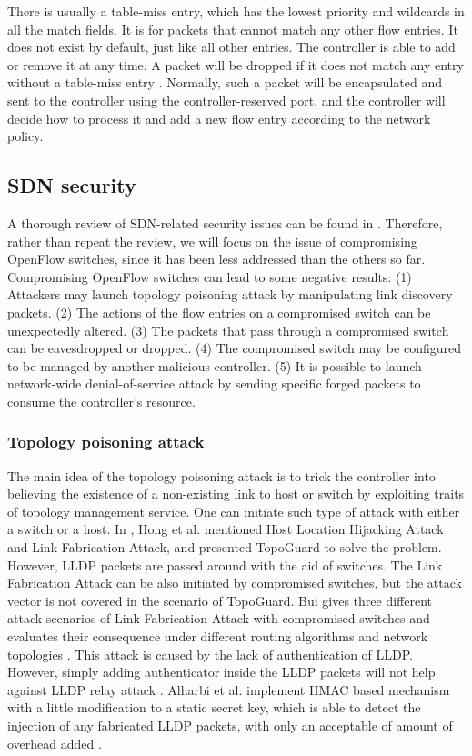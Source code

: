 \documentclass[conference]{IEEEtran}
\begin{document}
There is usually a table-miss entry, which has the lowest priority and wildcards in all the match fields. It is for packets that cannot match any other flow entries. It does not exist by default, just like all other entries. The controller is able to add or remove it at any time. A packet will be dropped if it does not match any entry without a table-miss entry \cite{OF_SPEC}. Normally, such a packet will be encapsulated and sent to the controller using the controller-reserved port, and the controller will decide how to process it and add a new flow entry according to the network policy. 

\subsection{SDN security}
\label{SDN security}
A thorough review of SDN-related security issues can be found in \cite{LAB14, CM, SOS13, KJK}. Therefore, rather than repeat the review, we will focus on the issue of compromising OpenFlow switches, since it has been less addressed than the others so far. Compromising OpenFlow switches can lead to some negative results: (1) Attackers may launch topology poisoning attack by manipulating link discovery packets. (2) The actions of the flow entries on a compromised switch can be unexpectedly altered. (3) The packets that pass through a compromised switch can be eavesdropped or dropped. (4) The compromised switch may be configured to be managed by another malicious controller. (5) It is possible to launch network-wide denial-of-service attack by sending specific forged packets to consume the controller's resource.

\subsubsection{Topology poisoning attack}
The main idea of the topology poisoning attack is to trick the controller into believing the existence of a non-existing link to host or switch by exploiting traits of topology management service. One can initiate such type of attack with either a switch or a host. In \cite{HXWG15}, Hong et al. mentioned Host Location Hijacking Attack and Link Fabrication Attack, and presented TopoGuard to solve the problem. However, LLDP packets are passed around with the aid of switches. The Link Fabrication Attack can be also initiated by compromised switches, but the attack vector  is not covered in the scenario of TopoGuard. Bui gives three different attack scenarios of Link Fabrication Attack with compromised switches and evaluates their consequence under different routing algorithms and network topologies \cite{TTB15}. This attack is caused by the lack of authentication of LLDP. However, simply adding authenticator inside the LLDP packets will not help against LLDP relay attack \cite{HXWG15}. Alharbi et al. implement HMAC based mechanism with a little modification to a static secret key, which is able to detect the injection of any fabricated LLDP packets, with only an acceptable of amount of overhead added \cite{ATPP15}.
\end{document}
